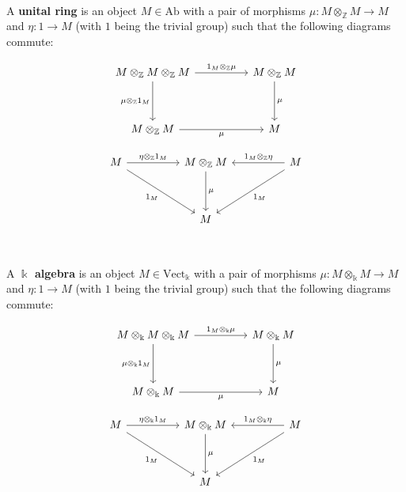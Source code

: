 \documentclass{article}
\begin{document}
\begin{definition}
\

A \textbf{unital ring} is an object $M \in \text{Ab}$ with a pair of morphisms $\mu: M \otimes_\mathbb{Z} M \to M$ and $\eta: 1 \to M$ (with $1$ being the trivial group) such that the following diagrams commute:  


\[\begin{tikzcd}
	M \otimes_\mathbb{Z} M \otimes_\mathbb{Z} M &&  M \otimes_\mathbb{Z} M\\
    \\
    M\otimes_\mathbb{Z} M &&  M
    \arrow[ from=1-1, to=1-3, "1_M \otimes_\mathbb{Z} \mu"]
    \arrow[ from=1-3, to=3-3, "\mu"]
    \arrow[from=1-1, to=3-1, "\mu \otimes_\mathbb{Z} 1_M"']
    \arrow[from=3-1, to=3-3, "\mu"']
\end{tikzcd}\]


\[\begin{tikzcd}
	M &&  M \otimes_\mathbb{Z} M && M\\
    \\
    && M &&  
    \arrow[ from=1-1, to=1-3, "\eta \otimes_\mathbb{Z} 1_M"]
    \arrow[ from=1-3, to=3-3, "\mu"]
    \arrow[from=1-5, to=1-3, "1_M \otimes_\mathbb{Z} \eta"']
    \arrow[from=1-1, to=3-3, "1_M"']
    \arrow[from=1-5, to=3-3, "1_M"]
\end{tikzcd}\]
\end{definition}

\begin{definition}
\

A \textbf{$\Bbbk$ algebra} is an object $M \in \text{Vect}_\Bbbk$ with a pair of morphisms $\mu: M \otimes_\Bbbk M \to M$ and $\eta: 1 \to M$ (with $1$ being the trivial group) such that the following diagrams commute:  


\[\begin{tikzcd}
	M \otimes_\Bbbk M \otimes_\Bbbk M &&  M \otimes_\Bbbk M\\
    \\
    M\otimes_\Bbbk M &&  M
    \arrow[ from=1-1, to=1-3, "1_M \otimes_\Bbbk \mu"]
    \arrow[ from=1-3, to=3-3, "\mu"]
    \arrow[from=1-1, to=3-1, "\mu \otimes_\Bbbk 1_M"']
    \arrow[from=3-1, to=3-3, "\mu"']
\end{tikzcd}\]


\[\begin{tikzcd}
	M &&  M \otimes_\Bbbk M && M\\
    \\
    && M &&  
    \arrow[ from=1-1, to=1-3, "\eta \otimes_\Bbbk 1_M"]
    \arrow[ from=1-3, to=3-3, "\mu"]
    \arrow[from=1-5, to=1-3, "1_M \otimes_\Bbbk \eta"']
    \arrow[from=1-1, to=3-3, "1_M"']
    \arrow[from=1-5, to=3-3, "1_M"]
\end{tikzcd}\]
\end{definition}
\end{document}
